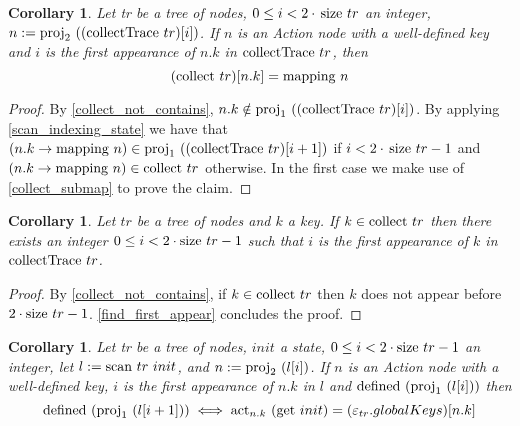 \documentclass{article}
\newtheorem{corollary}[lemma]{Corollary}
\newcommand{\textfun}[1]{\textup{#1}}
\newcommand{\scan}[2]{\textfun{scan}\ #1\ #2}
\newcommand{\collect}[1]{\textfun{collect}\ #1}
\newcommand{\collectTr}[1]{\textfun{collectTrace}\ #1}
\newcommand{\defined}[1]{\textfun{defined}\ #1}
\newcommand{\get}[1]{\textfun{get}\ #1}
\newcommand{\mapping}[1]{\textfun{mapping}\ #1}
\newcommand{\size}[1]{\textfun{size}\ #1}
\newcommand{\fst}[1]{\textfun{proj}_1\ #1}
\newcommand{\snd}[1]{\textfun{proj}_2\ #1}
\newcommand{\actkey}[2]{\textfun{act}_{#1}\ #2}
\newcommand{\emptyState}[1]{\varepsilon_{#1}}
\begin{document}
\begin{corollary}
    \label{first_mapping}
    Let tr be a tree of nodes, $0 \leq i < 2 \cdot \, \size{tr}$ an integer, 
    $n := \snd{((\collectTr{tr})[i])}$. If $n$ is an Action node with a well-defined key and $i$ is the first appearance of $n.k$ in $\collectTr{tr}$, then
    \[(\collect{tr})[n.k] = \mapping{n}\] 
\end{corollary}
    
\begin{proof}
    By \cref{collect_not_contains}, $n.k \notin \fst{((\collectTr{tr})[i])}$. By applying \cref{scan_indexing_state} we have that $(n.k \to \mapping{n}) \in \fst{((\collectTr{tr})[i + 1])}$
    if $i < 2 \cdot \, \size{tr} - 1$ and $(n.k \to \mapping{n}) \in \collect{tr}$ otherwise. In the first case we make use of \cref{collect_submap} to prove the claim.
\end{proof}

\begin{corollary}
    \label{find_k_first_appear}
    Let $tr$ be a tree of nodes and  $k$ a key. If $k \in \collect{tr}$ then there exists an integer $0 \leq  i < 2 \cdot \size{tr} - 1$ such that
    $i$ is the first appearance of $k$ in $\collectTr{tr}$.
\end{corollary}
\begin{proof}
    By \cref{collect_not_contains}, if $k \in \collect{tr}$ then $k$ does not appear before $2 \cdot \size{tr} - 1$. \cref{find_first_appear} concludes the proof.
\end{proof}

\begin{corollary}
    \label{defined_globalkeys_mapping}
    Let tr be a tree of nodes, $init$ a state, $0 \leq i < 2\cdot \size{tr} - 1$ an integer, let $l := \scan{tr}{init}$, and $n := \snd{(l[i])}$. 
   If $n$ is an Action node with a well-defined key, $i$ is the first appearance of $n.k$ in $l$ and $\defined{(\fst{(l[i])})}$ then 
   \[\defined{(\fst{(l[i + 1])})} \iff \actkey{n.k}{(\get{init})} = (\emptyState{tr}.globalKeys)[n.k]\]
\end{corollary}
\end{document}
